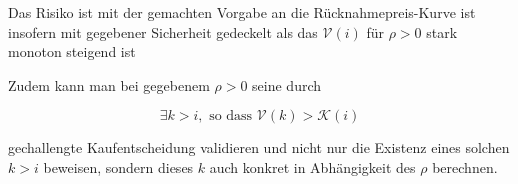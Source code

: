 \vspace{0.3cm}

Das Risiko ist mit der gemachten Vorgabe an die Rücknahmepreis-Kurve ist insofern mit gegebener Sicherheit gedeckelt als das $\mathcal{V} \left( i \right)$ für $\rho > 0$ stark monoton steigend ist

\vspace{0.3cm}

Zudem kann man bei gegebenem $\rho > 0$ seine durch

\begin{equation*}
\exists k > i, \textrm{  so dass } \mathcal{V} \left( k \right) > \mathcal{K} \left( i \right)
\end{equation*} 

gechallengte Kaufentscheidung validieren und nicht nur die Existenz eines solchen $k > i$ beweisen, sondern dieses $k$ auch konkret in Abhängigkeit des $\rho$ berechnen.

\vspace{0.3cm}


\vspace{0.3cm}


\vspace{0.5cm}
